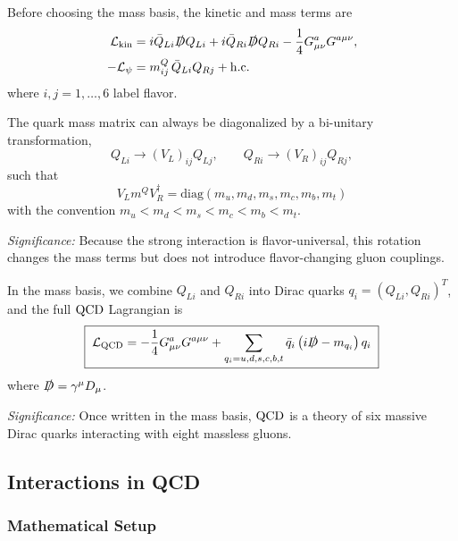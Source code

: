 \documentclass[../main.tex]{subfiles}
\begin{document}
Before choosing the mass basis, the kinetic and mass terms are
\begin{align}
  \mathcal{L}_{\mathrm{kin}}
  &= i\bar Q_{Li}\slashed D Q_{Li}
     + i\bar Q_{Ri}\slashed D Q_{Ri}
     -\frac14 G_{\mu\nu}^aG^{a\mu\nu},
  \label{eq:lec14:qcd_kinetic_chiral}\\
  -\mathcal{L}_\psi
  &= m^Q_{ij}\,\bar Q_{Li}Q_{Rj}+\mathrm{h.c.}
  \label{eq:lec14:qcd_mass_matrix}
\end{align}
where $i,j=1,\ldots,6$ label flavor.

The quark mass matrix can always be diagonalized by a bi-unitary transformation,
\begin{equation}
  Q_{Li}\to (V_L)_{ij}Q_{Lj},\qquad
  Q_{Ri}\to (V_R)_{ij}Q_{Rj},
  \label{eq:lec14:quark_basis_rotation}
\end{equation}
such that
\begin{equation}
  \boxed{\;V_L m^Q V_R^\dagger
  = \mathrm{diag}(m_u,m_d,m_s,m_c,m_b,m_t)\;}
  \label{eq:lec14:mass_diagonalization}
\end{equation}
with the convention $m_u<m_d<m_s<m_c<m_b<m_t$.

\textit{Significance:} Because the strong interaction is flavor-universal, this rotation changes the mass terms but does not introduce flavor-changing gluon couplings.

In the mass basis, we combine $Q_{Li}$ and $Q_{Ri}$ into Dirac quarks $q_i=(Q_{Li},Q_{Ri})^T$, and the full $\mathrm{QCD}$ Lagrangian is
\begin{equation}
  \boxed{\;\mathcal{L}_{\mathrm{QCD}}
  = -\frac14 G_{\mu\nu}^aG^{a\mu\nu}
    +\sum_{q_i=u,d,s,c,b,t}
    \bar q_i\left(i\slashed D-m_{q_i}\right)q_i\;}
  \label{eq:lec14:qcd_lagrangian}
\end{equation}
where $\slashed D=\gamma^\mu D_\mu$.

\textit{Significance:} Once written in the mass basis, $\mathrm{QCD}$ is a theory of six massive Dirac quarks interacting with eight massless gluons.

\subsection{Interactions in QCD}\label{sec:lec14:qcd-interactions}

\subsubsection*{Mathematical Setup}
\end{document}
